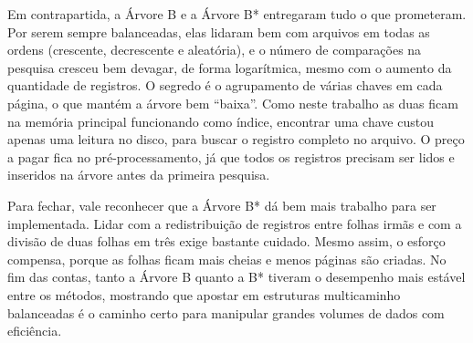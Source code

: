 \documentclass[12pt,a4paper]{article}
\begin{document}
Em contrapartida, a Árvore B e a Árvore B* entregaram tudo o que prometeram. Por serem
sempre balanceadas, elas lidaram bem com arquivos em todas as ordens (crescente,
decrescente e aleatória), e o número de comparações na pesquisa cresceu bem devagar,
de forma logarítmica, mesmo com o aumento da quantidade de registros. O segredo é o
agrupamento de várias chaves em cada página, o que mantém a árvore bem ``baixa''. Como
neste trabalho as duas ficam na memória principal funcionando como índice, encontrar
uma chave custou apenas uma leitura no disco, para buscar o registro completo no
arquivo. O preço a pagar fica no pré-processamento, já que todos os registros precisam
ser lidos e inseridos na árvore antes da primeira pesquisa.

Para fechar, vale reconhecer que a Árvore B* dá bem mais trabalho para ser
implementada. Lidar com a redistribuição de registros entre folhas irmãs e com a
divisão de duas folhas em três exige bastante cuidado. Mesmo assim, o esforço compensa,
porque as folhas ficam mais cheias e menos páginas são criadas. No fim das contas,
tanto a Árvore B quanto a B* tiveram o desempenho mais estável entre os métodos,
mostrando que apostar em estruturas multicaminho balanceadas é o caminho certo para
manipular grandes volumes de dados com eficiência.
\end{document}

